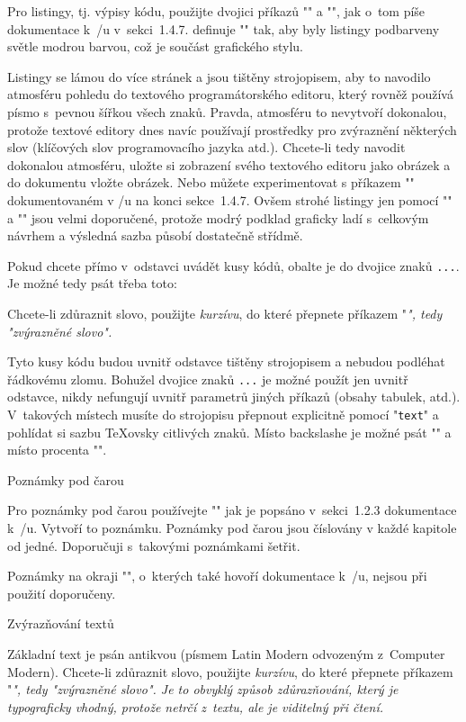 Pro listingy, tj. výpisy kódu, použijte dvojici příkazů "\begtt" a "\endtt",
jak o~tom píše dokumentace k~\OpTeX/u v~sekci~1.4.7. \ctustyle{} definuje
"\tthook" tak, aby byly listingy podbarveny světle modrou barvou, což je
součást grafického stylu.

Listingy se lámou do více stránek a jsou tištěny strojopisem, aby to
navodilo atmosféru pohledu do textového programátorského editoru, který
rovněž používá písmo s~pevnou šířkou všech znaků. Pravda, atmosféru to
nevytvoří dokonalou, protože textové editory dnes navíc používají prostředky pro
zvýraznění některých slov (klíčových slov programovacího jazyka atd.).
Chcete-li tedy navodit dokonalou atmosféru, uložte
si zobrazení svého textového editoru jako obrázek a do dokumentu vložte
obrázek. Nebo můžete experimentovat s příkazem "\hisyntax" dokumentovaném v
\OpTeX/u na konci sekce~1.4.7.
Ovšem strohé listingy jen pomocí "\begtt" a "\endtt" jsou velmi doporučené,
protože modrý podklad graficky ladí s~celkovým návrhem \ctustyle{}
a výsledná sazba působí dostatečně střídmě.

Pokud chcete přímo v~odstavci uvádět kusy kódů, obalte je do dvojice 
znaků {\tt\dprime...\dprime}. Je možné tedy psát třeba toto:

\begtt
Chcete-li zdůraznit slovo, použijte {\em kurzívu}, do které
přepnete příkazem "\em", tedy "{\em zvýrazněné slovo}". 
\endtt

Tyto kusy kódu budou uvnitř odstavce tištěny strojopisem a nebudou podléhat
řádkovému zlomu. Bohužel dvojice znaků {\tt\dprime...\dprime} je možné použít jen
uvnitř  odstavce, nikdy nefungují uvnitř parametrů jiných
příkazů (obsahy tabulek, atd.). V~takových místech musíte
do strojopisu přepnout explicitně pomocí "{\tt text}" a pohlídat si sazbu
\TeX{}ovsky citlivých znaků. 
Místo backslashe je možné psát "\bslash" a místo
procenta "\pcent".


\secc Poznámky pod čarou

Pro poznámky pod čarou používejte "" jak je popsáno 
v~sekci~1.2.3 dokumentace k~\OpTeX/u. Vytvoří to poznámku. 
Poznámky pod čarou jsou číslovány v každé kapitole od jedné. Doporučuji 
s~takovými poznámkami šetřit.

Poznámky na okraji "\mnote", o~kterých také
hovoří dokumentace k~\OpTeX/u, nejsou při použití \ctustyle{} doporučeny.


\secc Zvýrazňování textů

Základní text je psán antikvou (písmem Latin Modern odvozeným z~Computer
Modern). Chcete-li zdůraznit slovo, použijte {\em kurzívu}, do které
přepnete příkazem "\em", tedy "{\em zvýrazněné slovo}". 
Je to obvyklý způsob zdůrazňování, který je typograficky vhodný, protože
netrčí z~textu, ale je viditelný při čtení.

